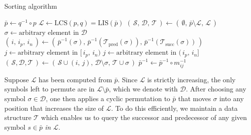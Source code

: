 \documentclass[sn-mathphys]{sn-jnl}
\begin{document}
  \begin{algorithm}[h!]
	\caption{Sorting algorithm}\label{alg:sorting}
    \begin{algorithmic}[1]
    		\State $\bar{p} \gets q^{-1} \circ p$
    		\State $\mathcal{L} \gets \mathrm{LCS}(p,q) = \mathrm{LIS}(\bar{p})$ 
    		\State $(\, \mathcal{S}, \, \mathcal{D}, \, \mathcal{T} \, )\gets (\, \emptyset, \, \bar{p} \setminus \mathcal{L}, \, \mathcal{L} \,)$
    		    \State $\sigma \gets \text{arbitrary element in }\mathcal{D}$
    		    \State $(\,i, \,i_p, \, i_n \,) \gets ( \, \bar{p}^{-1}(\sigma), \, \bar{p}^{-1}(\mathcal{T}_{\mathrm{pred}}(\sigma)), \, \bar{p}^{-1}(\mathcal{T}_{\mathrm{succ}}(\sigma)) \, )$
    		    	\State $j \gets \text{arbitrary element in } [\, i_p, \, i_n)$
	    		    \State $j \gets \text{arbitrary element in } (\, i_p, \, i_n]$ 
    		    \EndIf
    		    \State $(\, \mathcal{S}, \mathcal{D}, \mathcal{T} \,) \gets (\, \mathcal{S} \cup (i, \, j), \, \mathcal{D} \setminus \sigma, \, \mathcal{T} \cup \sigma \, )$
    		    \State $\bar{p}^{-1} \gets \bar{p}^{-1} \circ m_{ij}^{-1}$ 
    		 \EndWhile
    		 \State {}
    	\EndFunction
	\end{algorithmic}
\end{algorithm}
Suppose $\mathcal{L}$ has been computed from $\bar{p}$. Since $\mathcal{L}$ is strictly increasing, the only symbols left to permute are in $\mathcal{L} \setminus \bar{p}$, which we denote with $\mathcal{D}$.
After choosing any symbol $\sigma \in \mathcal{D}$, one then applies a cyclic permutation to $\bar{p}$ that moves $\sigma$ into any position that increases the size of $\mathcal{L}$. To do this efficiently, we maintain a data structure $\mathcal{T}$ which enables us to query the successor and predecessor of any given symbol $s \in \bar{p}$ \emph{in} $\mathcal{L}$. 
\end{document}
